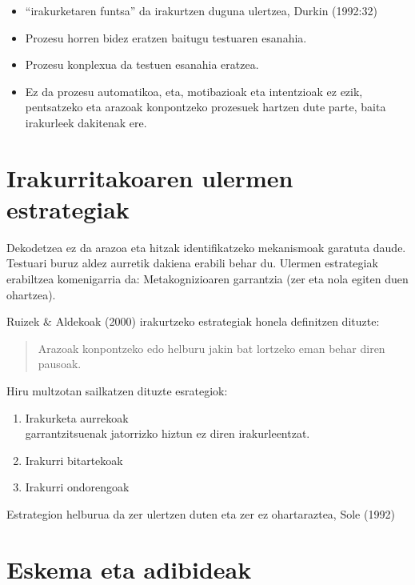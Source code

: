 \documentclass[
]{book}
\providecommand{\tightlist}{%
  \setlength{\itemsep}{0pt}\setlength{\parskip}{0pt}}
\begin{document}
\begin{itemize}
\tightlist
\item
  ``irakurketaren funtsa'' da irakurtzen duguna ulertzea, Durkin (1992:32)
\item
  Prozesu horren bidez eratzen baitugu testuaren esanahia.
\item
  Prozesu konplexua da testuen esanahia eratzea.
\item
  Ez da prozesu automatikoa, eta, motibazioak eta intentzioak ez ezik, pentsatzeko eta arazoak konpontzeko prozesuek hartzen dute parte, baita irakurleek dakitenak ere.
\end{itemize}

\hypertarget{irakurritakoaren-ulermen-estrategiak}{%
\section{Irakurritakoaren ulermen estrategiak}\label{irakurritakoaren-ulermen-estrategiak}}

Dekodetzea ez da arazoa eta hitzak identifikatzeko mekanismoak garatuta daude.
Testuari buruz aldez aurretik dakiena erabili behar du.
Ulermen estrategiak erabiltzea komenigarria da: Metakognizioaren garrantzia (zer eta nola egiten duen ohartzea).

Ruizek \& Aldekoak (2000) irakurtzeko estrategiak honela definitzen dituzte:

\begin{quote}
Arazoak konpontzeko edo helburu jakin bat lortzeko eman behar diren pausoak.
\end{quote}

Hiru multzotan sailkatzen dituzte esrategiok:

\begin{enumerate}
\def\labelenumi{\arabic{enumi}.}
\tightlist
\item
  Irakurketa aurrekoak\\
  garrantzitsuenak jatorrizko hiztun ez diren irakurleentzat.
\item
  Irakurri bitartekoak
\item
  Irakurri ondorengoak
\end{enumerate}

Estrategion helburua da zer ulertzen duten eta zer ez ohartaraztea, Sole (1992)

\hypertarget{eskema-eta-adibideak}{%
\section{Eskema eta adibideak}\label{eskema-eta-adibideak}}
\end{document}
